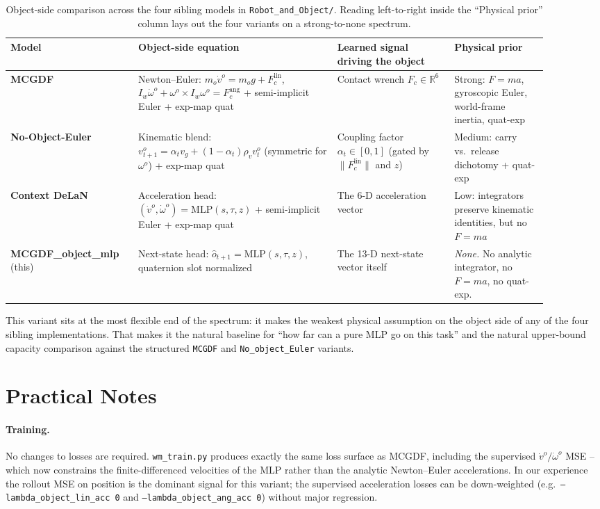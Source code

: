 \documentclass[11pt]{article}
\begin{document}
\begin{table}[h]
\centering
\small
\begin{tabular}{p{0.20\linewidth} p{0.34\linewidth} p{0.20\linewidth} p{0.16\linewidth}}
\toprule
Model & Object-side equation & Learned signal driving the object & Physical prior \\
\midrule
\textbf{MCGDF} & Newton--Euler:
\(m_o\dot v^o = m_o g + F_c^{\mathrm{lin}}\),
\(I_w \dot\omega^o + \omega^o\!\times\! I_w\omega^o = F_c^{\mathrm{ang}}\) +
semi-implicit Euler + exp-map quat
& Contact wrench $F_c \in \mathbb{R}^6$
& Strong: $F=ma$, gyroscopic Euler, world-frame inertia, quat-exp \\
\textbf{No-Object-Euler} & Kinematic blend:
\(v^o_{t+1} = \alpha_t v_g + (1-\alpha_t)\rho_v v^o_t\)
(symmetric for $\omega^o$) + exp-map quat
& Coupling factor $\alpha_t \in [0,1]$ (gated by $\|F_c^{\mathrm{lin}}\|$ and $z$)
& Medium: carry vs.\ release dichotomy + quat-exp \\
\textbf{Context DeLaN} & Acceleration head:
\((\dot v^o, \dot\omega^o) = \mathrm{MLP}(s,\tau,z)\) + semi-implicit Euler + exp-map quat
& The 6-D acceleration vector
& Low: integrators preserve kinematic identities, but no $F=ma$ \\
\textbf{MCGDF\_object\_mlp} (this) & Next-state head:
\(\hat o_{t+1} = \mathrm{MLP}(s,\tau,z)\), quaternion slot normalized
& The 13-D next-state vector itself
& \emph{None.}  No analytic integrator, no $F=ma$, no quat-exp. \\
\bottomrule
\end{tabular}
\caption{Object-side comparison across the four sibling models in
\texttt{Robot\_and\_Object/}.  Reading left-to-right inside the
``Physical prior'' column lays out the four variants on a
strong-to-none spectrum.}
\label{tab:om-vs-others}
\end{table}

This variant sits at the most flexible end of the spectrum: it makes
the weakest physical assumption on the object side of any of the four
sibling implementations.  That makes it the natural baseline for
``how far can a pure MLP go on this task'' and the natural
upper-bound capacity comparison against the structured
\texttt{MCGDF} and \texttt{No\_object\_Euler} variants.

\section{Practical Notes}

\paragraph{Training.}  No changes to losses are required.
\texttt{wm\_train.py} produces exactly the same loss surface as
MCGDF, including the supervised
$\dot v^o / \dot \omega^o$ MSE -- which now constrains the
finite-differenced velocities of the MLP rather than the analytic
Newton--Euler accelerations.  In our experience the rollout MSE on
position is the dominant signal for this variant; the supervised
acceleration losses can be down-weighted (e.g.\
\texttt{--lambda\_object\_lin\_acc 0} and
\texttt{--lambda\_object\_ang\_acc 0}) without major regression.
\end{document}
